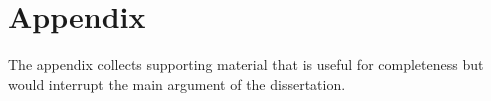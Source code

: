 \documentclass[ twoside,openright,titlepage,numbers=noenddot,headinclude,%
                footinclude=true,cleardoublepage=empty,abstract=false,
                BCOR=5mm,paper=a4,fontsize=11pt,%
                ngerman,american,%
                ]{scrreprt}
\begin{document}


\appendix
\cleardoublepage
\part{Appendix}

\noindent
The appendix collects supporting material that is useful for completeness but would interrupt the main argument of the dissertation.


\cleardoublepage

\end{document}
